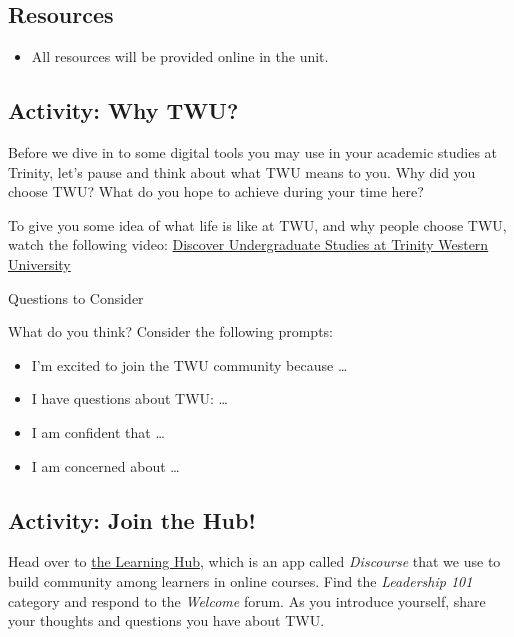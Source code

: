 \documentclass[
]{book}
\providecommand{\tightlist}{%
  \setlength{\itemsep}{0pt}\setlength{\parskip}{0pt}}
\theoremstyle{definition}
\theoremstyle{definition}
\theoremstyle{definition}
\theoremstyle{definition}
\theoremstyle{remark}
\begin{document}
\hypertarget{resources}{%
\subsection*{Resources}\label{resources}}

\begin{itemize}
\tightlist
\item
  All resources will be provided online in the unit.
\end{itemize}

\hypertarget{activity-why-twu}{%
\subsection*{Activity: Why TWU?}\label{activity-why-twu}}

\begin{reflect}
Before we dive in to some digital tools you may use in your academic studies at Trinity, let's pause and think about what TWU means to you. Why did you choose TWU? What do you hope to achieve during your time here?

To give you some idea of what life is like at TWU, and why people choose TWU, watch the following video: \href{https://youtu.be/Xlqpgb_3cR4?feature=shared}{Discover Undergraduate Studies at Trinity Western University}

{Questions to Consider}

What do you think? Consider the following prompts:

\begin{itemize}
\tightlist
\item
  I'm excited to join the TWU community because \ldots{}
\item
  I have questions about TWU: \ldots{}
\item
  I am confident that \ldots{}
\item
  I am concerned about \ldots{}
\end{itemize}
\end{reflect}

\hypertarget{activity-join-the-hub}{%
\subsection*{Activity: Join the Hub!}\label{activity-join-the-hub}}

\begin{reflect}
Head over to \href{https://twu.discourse.group}{the Learning Hub}, which is an app called \emph{Discourse} that we use to build community among learners in online courses. Find the \emph{Leadership 101} category and respond to the \emph{Welcome} forum. As you introduce yourself, share your thoughts and questions you have about TWU.
\end{reflect}
\end{document}
